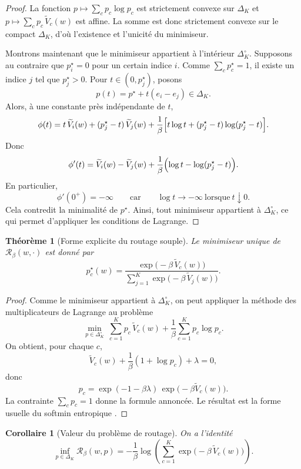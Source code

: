 \documentclass[11pt,a4paper]{article}
\newtheorem{theorem}{Théorème}[section]
\newtheorem{corollary}{Corollaire}[section]
\newcommand{\Rcal}{\mathcal R}
\begin{document}
\begin{proof}
La fonction \(p\mapsto \sum_c p_c\log p_c\) est strictement convexe sur \(\Delta_K\) et \(p\mapsto \sum_c p_c\,\widetilde V_c(w)\) est affine. La somme est donc strictement convexe sur le compact \(\Delta_K\), d'où l'existence et l'unicité du minimiseur.

Montrons maintenant que le minimiseur appartient à l'intérieur \(\Delta_K^\circ\). Supposons au contraire que \(p^\star_i=0\) pour un certain indice \(i\). Comme \(\sum_c p^\star_c=1\), il existe un indice \(j\) tel que \(p^\star_j>0\). Pour \(t\in(0,p^\star_j)\), posons
\[
p(t)=p^\star+t(e_i-e_j)\in\Delta_K.
\]
Alors, à une constante près indépendante de \(t\),
\[
\phi(t)
=
t\,\widetilde V_i(w)
+
(p^\star_j-t)\,\widetilde V_j(w)
+
\frac{1}{\beta}\Bigl[t\log t+(p^\star_j-t)\log(p^\star_j-t)\Bigr].
\]
Donc
\[
\phi'(t)
=
\widetilde V_i(w)-\widetilde V_j(w)
+
\frac{1}{\beta}\Bigl(\log t-\log(p^\star_j-t)\Bigr).
\]
En particulier,
\[
\phi'(0^+)=-\infty
\qquad\text{car}\qquad
\log t\to-\infty\ \text{lorsque}\ t\downarrow0.
\]
Cela contredit la minimalité de \(p^\star\). Ainsi, tout minimiseur appartient à \(\Delta_K^\circ\), ce qui permet d'appliquer les conditions de Lagrange.
\end{proof}

\begin{theorem}[Forme explicite du routage souple]
Le minimiseur unique de \(\Rcal_\beta(w,\cdot)\) est donné par
\[
p_c^\star(w)
=
\frac{\exp\!\bigl(-\beta\,\widetilde V_c(w)\bigr)}
{\sum_{j=1}^K \exp\!\bigl(-\beta\,\widetilde V_j(w)\bigr)}.
\]
\end{theorem}

\begin{proof}
Comme le minimiseur appartient à \(\Delta_K^\circ\), on peut appliquer la méthode des multiplicateurs de Lagrange au problème
\[
\min_{p\in\Delta_K^\circ}\ \sum_{c=1}^K p_c\,\widetilde V_c(w)+\frac{1}{\beta}\sum_{c=1}^K p_c\log p_c.
\]
On obtient, pour chaque \(c\),
\[
\widetilde V_c(w)+\frac{1}{\beta}(1+\log p_c)+\lambda=0,
\]
donc
\[
p_c=\exp(-1-\beta\lambda)\,\exp\!\bigl(-\beta\widetilde V_c(w)\bigr).
\]
La contrainte \(\sum_c p_c=1\) donne la formule annoncée. Le résultat est la forme usuelle du softmin entropique \cite{BauschkeCombettes2017,Clarke1983}.
\end{proof}

\begin{corollary}[Valeur du problème de routage]
On a l'identité
\[
\inf_{p\in\Delta_K}\Rcal_\beta(w,p)
=
-\frac{1}{\beta}\log\!\left(\sum_{c=1}^K \exp\!\bigl(-\beta\,\widetilde V_c(w)\bigr)\right).
\]
\end{corollary}
\end{document}
